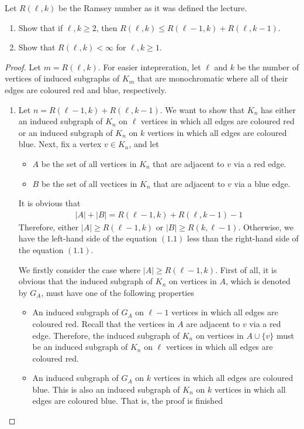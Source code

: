 \begin{problem}
    Let $R(\ell,k)$ be the Ramsey number as it was defined the lecture.
    \begin{enumerate}
        \item Show that if $\ell,k \geq 2$, then $R(\ell,k) \leq R(\ell-1,k) + R(\ell,k-1)$.
        \item Show that $R(\ell,k) < \infty$ for $\ell,k \geq 1$.
    \end{enumerate}
\end{problem}
\begin{proof}
    Let $m = R(\ell,k)$. For easier intepreration, let $\ell$ and $k$ be the number of vertices of induced subgraphs of $K_{m}$ that are monochromatic where all of their edges are coloured red and blue, respectively.
    \begin{enumerate}
        \item Let $n = R(\ell-1,k) + R(\ell,k-1)$. We want to show that $K_{n}$ has either an induced subgraph of $K_{n}$ on $\ell$ vertices in which all edges are coloured red or an induced subgraph of $K_{n}$ on $k$ vertices in which all edges are coloured blue. Next, fix a vertex $v \in K_{n}$, and let 
        \begin{itemize}
            \item $A$ be the set of all vertices in $K_{n}$ that are adjacent to $v$ via a red edge.
            \item $B$ be the set of all vectices in $K_{n}$ that are adjacent to $v$ via a blue edge.
        \end{itemize}
        It is obvious that 
        \begin{align*}
            |A| + |B| = R(\ell-1,k) + R(\ell,k-1) - 1 \tag{1.1}
        \end{align*}
        Therefore, either $|A| \geq R(\ell-1,k)$ or $|B| \geq R(k,\ell-1)$. Otherwise, we have the left-hand side of the equation $(1.1)$ less than the right-hand side of the equation $(1.1)$.

        We firstly consider the case where $|A| \geq R(\ell-1,k)$. First of all, it is obvious that the induced subgraph of $K_{n}$ on vertices in $A$, which is denoted by $G_{A}$, must have one of the following properties 
        \begin{itemize}
            \item An induced subgraph of $G_{A}$ on $\ell-1$ vertices in which all edges are coloured red. Recall that the vertices in $A$ are adjacent to $v$ via a red edge. Therefore, the induced subgraph of $K_{n}$ on vertices in $A \cup \{v\}$ must be an induced subgraph of $K_{n}$ on $\ell$ vertices in which all edges are coloured red. 
            \item An induced subgraph of $G_{A}$ on $k$ vertices in which all edges are coloured blue. This is also an induced subgraph of $K_{n}$ on $k$ vertices in which all edges are coloured blue. That is, the proof is finished
        \end{itemize}
        

\end{enumerate}
\end{proof}
